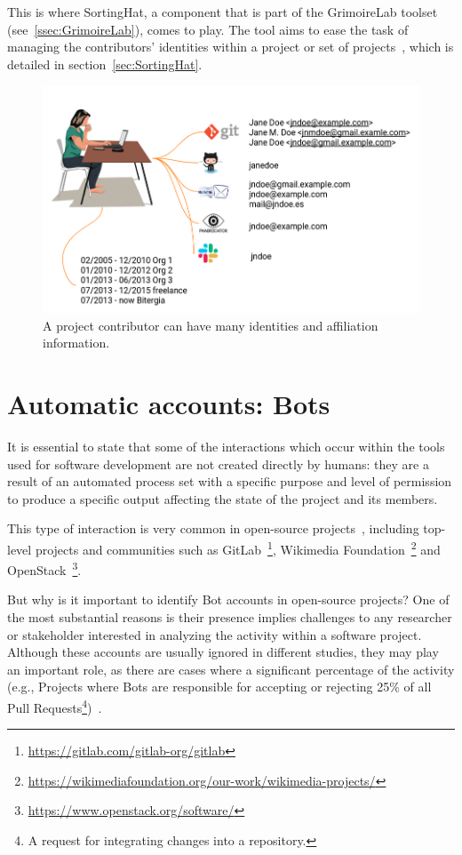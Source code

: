\documentclass[a4paper, 12pt]{book}
\begin{document}
This is where SortingHat, a component that is part of the GrimoireLab toolset (see~\ref{ssec:GrimoireLab}), comes to play. The tool aims to ease the task of managing the contributors' identities within a project or set of projects~\cite{moreno_et_al:sortinghat}, which is detailed in section~\ref{sec:SortingHat}. 

\begin{figure}
 \centering
  \includegraphics[width=12cm, keepaspectratio]{img/example-identity}
  \caption{A project contributor can have many identities and affiliation information.}
  \label{fig:example-identity}
\end{figure}

\section{Automatic accounts: Bots}
\label{sec:intro-bots}

It is essential to state that some of the interactions which occur within the tools used for software development are not created directly by humans: they are a result of an automated process set with a specific purpose and level of permission to produce a specific output affecting the state of the project and its members.

This type of interaction is very common in open-source projects~\cite{erlenhov-et-al:emprirical-study-bots-oss20}, including top-level projects and communities such as GitLab~\footnote{\url{https://gitlab.com/gitlab-org/gitlab}}, Wikimedia Foundation~\footnote{\url{https://wikimediafoundation.org/our-work/wikimedia-projects/}} and OpenStack~\footnote{\url{https://www.openstack.org/software/}}.

But why is it important to identify Bot accounts in open-source projects? One of the most substantial reasons is their presence implies challenges to any researcher or stakeholder interested in analyzing the activity within a software project. Although these accounts are usually ignored in different studies, they may play an important role, as there are cases where a significant percentage of the activity (e.g., Projects where Bots are responsible for accepting or rejecting 25\% of all Pull Requests\footnote{A request for integrating changes into a repository.})~\cite{golzadeh-mens:ground-truth-github2021}.
\end{document}
